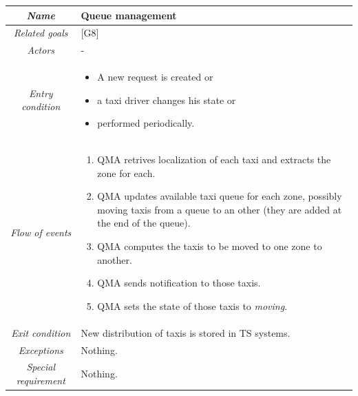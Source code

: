 \begin{flushleft}
\begin{tabular}{c|>{\centering}p{10cm}}
\hline 
\emph{Name} & \raggedright{}Queue management\tabularnewline
\hline 
\emph{Related goals} & \raggedright{}{[}G8{]}\tabularnewline
\hline 
\emph{Actors} & \raggedright{}-\tabularnewline
\hline 
\emph{Entry condition} & \begin{itemize}
\item \begin{raggedright}
A new request is created or
\par\end{raggedright}
\item \begin{raggedright}
a taxi driver changes his state or
\par\end{raggedright}
\item \raggedright{}performed periodically.\end{itemize}
\tabularnewline
\hline 
\emph{Flow of events} & \begin{enumerate}
\item \begin{raggedright}
QMA retrives localization of each taxi and extracts the zone for each.
\par\end{raggedright}
\item \begin{raggedright}
QMA updates available taxi queue for each zone, possibly moving taxis
from a queue to an other (they are added at the end of the queue).
\par\end{raggedright}
\item \begin{raggedright}
QMA computes the taxis to be moved to one zone to another.
\par\end{raggedright}
\item \begin{raggedright}
QMA sends notification to those taxis.
\par\end{raggedright}
\item \raggedright{}QMA sets the state of those taxis to \emph{moving}.\end{enumerate}
\tabularnewline
\hline 
\emph{Exit condition} & \raggedright{}New distribution of taxis is stored in TS systems.\tabularnewline
\hline 
\emph{Exceptions} & \raggedright{}Nothing.\tabularnewline
\hline 
\emph{Special requirement} & \raggedright{}Nothing.\tabularnewline
\hline 
\end{tabular}
\par\end{flushleft}

